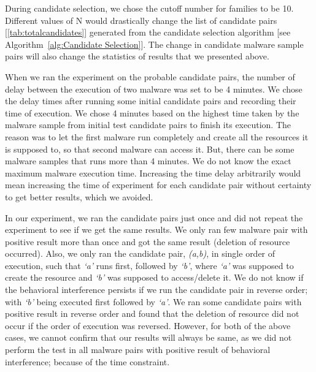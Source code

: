 During candidate selection, we chose the cutoff number for families to be 10.
Different values of N would drastically change the list of candidate pairs [\autoref{tab:totalcandidates}] generated from the candidate selection algorithm [see Algorithm~\autoref{alg:Candidate Selection}].
The change in candidate malware sample pairs will also change the statistics of results that we presented above.

When we ran the experiment on the probable candidate pairs, the number of delay between the execution of two malware was set to be 4 minutes.
We chose the delay times after running some initial candidate pairs and recording their time of execution.
We chose 4 minutes based on the highest time taken by the malware sample from initial test candidate pairs to finish its execution.
The reason was to let the first malware run completely and create all the resources it is supposed to, so that second malware can access it.
But, there can be some malware samples that runs more than 4 minutes.
We do not know the exact maximum malware execution time.
Increasing the time delay arbitrarily would mean increasing the time of experiment for each candidate pair without certainty to get better results, which we avoided.

In our experiment, we ran the candidate pairs just once and did not repeat the experiment to see if we get the same results.
We only ran few malware pair with positive result more than once and got the same result (deletion of resource occurred).
Also, we only ran the candidate pair, \emph{(a,b)}, in single order of execution, such that \emph{`a'} runs first, followed by \emph{`b'}, where \emph{`a'} was supposed to create the resource and \emph{`b'} was supposed to access/delete it.
We do not know if the behavioral interference persists if we run the candidate pair in reverse order; with \emph{`b'} being executed first followed by \emph{`a'}.
We ran some candidate pairs with positive result in reverse order and found that the deletion of resource did not occur if the order of execution was reversed.
However, for both of the above cases, we cannot confirm that our results will always be same, as we did not perform the test in all malware pairs with positive result of behavioral interference; because of the time constraint.

